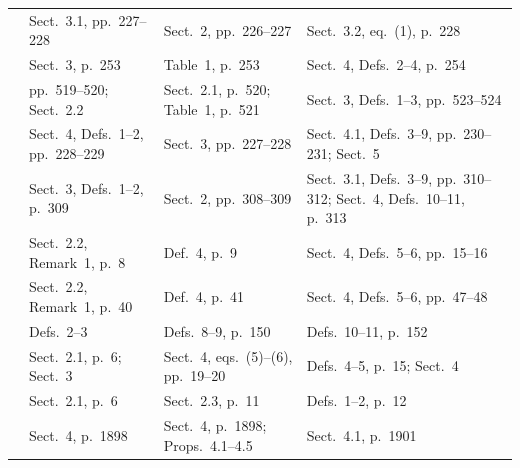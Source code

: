 {\begin{longtable}{@{}p{}p{}p{}p{}@{}}
            \cite{Mateis00}             & Sect.~3.1, pp.~227--228                               & Sect.~2, pp.~226--227                           & Sect.~3.2, eq.~(1), p.~228                                         \\
            \cite{Guller02}             & Sect.~3, p.~253                                       & Table~1, p.~253                                 & Sect.~4, Defs.~2--4, p.~254                                        \\
            \cite{Guller2004procedural} & pp.~519--520; Sect.~2.2                               & Sect.~2.1, p.~520; Table~1, p.~521              & Sect.~3, Defs.~1--3, pp.~523--524                                  \\
            \cite{Saad2009extended}     & Sect.~4, Defs.~1--2, pp.~228--229                     & Sect.~3, pp.~227--228                           & Sect.~4.1, Defs.~3--9, pp.~230--231; Sect.~5                       \\
            \cite{Saad2010disjunctive}  & Sect.~3, Defs.~1--2, p.~309                           & Sect.~2, pp.~308--309                           & Sect.~3.1, Defs.~3--9, pp.~310--312; Sect.~4, Defs.~10--11, p.~313 \\
            \cite{NievesOC07}           & Sect.~2.2, Remark~1, p.~8                             & Def.~4, p.~9                                    & Sect.~4, Defs.~5--6, pp.~15--16                                    \\
            \cite{NievesOC13}           & Sect.~2.2, Remark~1, p.~40                            & Def.~4, p.~41                                   & Sect.~4, Defs.~5--6, pp.~47--48                                    \\
            \cite{NicolasGSL06}         & Defs.~2--3                                            & Defs.~8--9, p.~150                              & Defs.~10--11, p.~152                                               \\
            \cite{BautersSDV14tplp}     & Sect.~2.1, p.~6; Sect.~3                              & Sect.~4, eqs.~(5)--(6), pp.~19--20              & Defs.~4--5, p.~15; Sect.~4                                         \\
            \cite{BautersSDV14ijar}     & Sect.~2.1, p.~6                                       & Sect.~2.3, p.~11                                & Defs.~1--2, p.~12                                                  \\
            \cite{StracciaOD09}         & Sect.~4, p.~1898                                      & Sect.~4, p.~1898; Props.~4.1--4.5               & Sect.~4.1, p.~1901                                                 \\

\end{longtable}}
